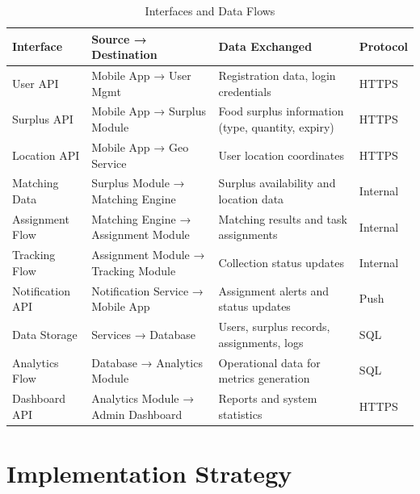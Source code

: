 \documentclass[conference]{IEEEtran}
\begin{document}
\begin{table}[H]
\centering
\caption{Interfaces and Data Flows}
\label{tab:interfaces}
\begin{tabular}{@{}p{2.0cm}p{1.8cm}p{2.5cm}p{1.2cm}@{}}
\toprule
\textbf{Interface} & \textbf{Source → Destination} & \textbf{Data Exchanged} & \textbf{Protocol} \\
\midrule
User API & Mobile App → User Mgmt & Registration data, login credentials & HTTPS \\
Surplus API & Mobile App → Surplus Module & Food surplus information (type, quantity, expiry) & HTTPS \\
Location API & Mobile App → Geo Service & User location coordinates & HTTPS \\
Matching Data & Surplus Module → Matching Engine & Surplus availability and location data & Internal \\
Assignment Flow & Matching Engine → Assignment Module & Matching results and task assignments & Internal \\
Tracking Flow & Assignment Module → Tracking Module & Collection status updates & Internal \\
Notification API & Notification Service → Mobile App & Assignment alerts and status updates & Push \\
Data Storage & Services → Database & Users, surplus records, assignments, logs & SQL \\
Analytics Flow & Database → Analytics Module & Operational data for metrics generation & SQL \\
Dashboard API & Analytics Module → Admin Dashboard & Reports and system statistics & HTTPS \\
\bottomrule
\end{tabular}
\end{table}

\section{Implementation Strategy}
\end{document}
